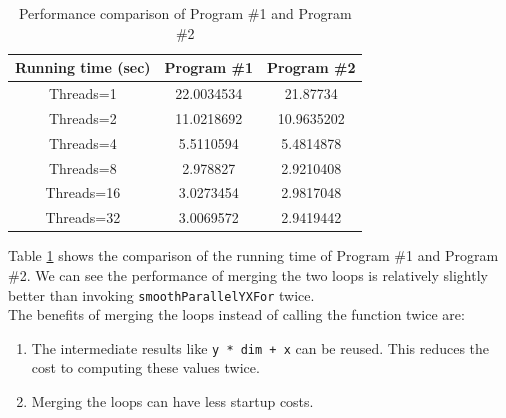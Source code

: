 \documentclass[letterpaper, 11pt]{article}
\begin{document}
\begin{enumerate}
\begin{table}
    \hspace{70pt}
    \begin{tabular}{|c|c|c|}
        \hline
        Running time (sec) & Program \#1 & Program \#2 \\ \hline
        Threads=1          & 22.0034534  & 21.87734    \\ 
        Threads=2          & 11.0218692  & 10.9635202  \\ 
        Threads=4          & 5.5110594   & 5.4814878   \\ 
        Threads=8          & 2.978827    & 2.9210408   \\ 
        Threads=16         & 3.0273454   & 2.9817048   \\ 
        Threads=32         & 3.0069572   & 2.9419442   \\
        \hline
    \end{tabular}
    \caption{Performance comparison of Program \#1 and Program \#2}
    \label{tab:prog12comp}
\end{table}

Table \ref{tab:prog12comp} shows the comparison of the running time of Program \#1 and Program \#2. We can see the performance of merging the two loops is relatively slightly better than invoking \texttt{smoothParallelYXFor} twice. \\
The benefits of merging the loops instead of calling the function twice are:
\begin{enumerate}
\item The intermediate results like \texttt{y * dim + x} can be reused. This reduces the cost to computing these values twice. 
\item Merging the loops can have less startup costs.
\end{enumerate}
\end{enumerate}
\end{document}
